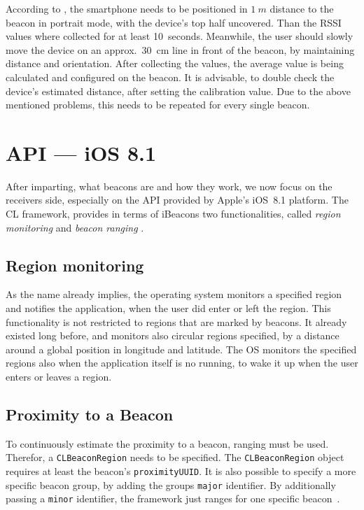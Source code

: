 According to \citet{apple:getting_started}, the smartphone needs to be positioned in $1~m$ distance to the beacon in portrait mode, with the device's top half uncovered. Than the \ac{RSSI} values where collected for at least 10~seconds. Meanwhile, the user should slowly move the device on an approx.\ 30~cm line in front of the beacon, by maintaining distance and orientation. After collecting the values, the average value is being calculated and configured on the beacon. It is advisable, to double check the device's estimated distance, after setting the calibration value. Due to the above mentioned problems, this needs to be repeated for every single beacon.

\section{API --- iOS 8.1}
After imparting, what beacons are and how they work, we now focus on the receivers side, especially on the \acs{API} provided by Apple's iOS~8.1 platform. The \ac{CL} framework, provides in terms of iBeacons two functionalities, called \emph{region monitoring} and \emph{beacon ranging} \citep{apple:ios_doc_cl}.

\subsection*{Region monitoring}
As the name already implies, the operating system monitors a specified region and notifies the application, when the user did enter or left the region. This functionality is not restricted to regions that are marked by beacons. It already existed long before, and monitors also circular regions specified, by a distance around a global position in longitude and latitude.
The \ac{OS} monitors the specified regions also when the application itself is no running, to wake it up when the user enters or leaves a region.

\subsection*{Proximity to a Beacon}
To continuously estimate the proximity to a beacon, ranging must be used. Therefor, a \texttt{CLBeaconRegion} needs to be specified. The \texttt{CLBeaconRegion} object requires at least the beacon's \texttt{proximityUUID}. It is also possible to specify a more specific beacon group, by adding the groups \texttt{major} identifier. By additionally passing a \texttt{minor} identifier, the framework just ranges for one specific beacon~\citep{apple:ios_doc_cl}.

